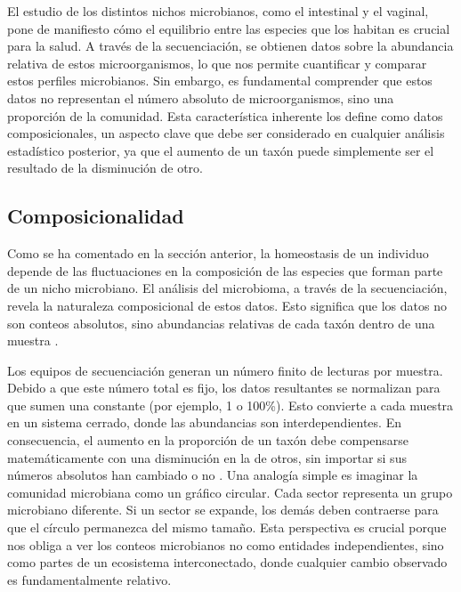 
El estudio de los distintos nichos microbianos, como el intestinal y el vaginal, pone de manifiesto cómo el equilibrio entre las especies que los habitan es crucial para la salud. A través de la secuenciación, se obtienen datos sobre la abundancia relativa de estos microorganismos, lo que nos permite cuantificar y comparar estos perfiles microbianos. Sin embargo, es fundamental comprender que estos datos no representan el número absoluto de microorganismos, sino una proporción de la comunidad. Esta característica inherente los define como datos composicionales, un aspecto clave que debe ser considerado en cualquier análisis estadístico posterior, ya que el aumento de un taxón puede simplemente ser el resultado de la disminución de otro.


\subsection{Composicionalidad}

Como se ha comentado en la sección anterior, la homeostasis de un individuo depende de las fluctuaciones en la composición de las especies que forman parte de un nicho microbiano. El análisis del microbioma, a través de la secuenciación, revela la naturaleza composicional de estos datos. Esto significa que los datos no son conteos absolutos, sino abundancias relativas de cada taxón dentro de una muestra \cite{busato2023compositionality}.

Los equipos de secuenciación generan un número finito de lecturas por muestra. Debido a que este número total es fijo, los datos resultantes se normalizan para que sumen una constante (por ejemplo, 1 o 100\%). Esto convierte a cada muestra en un sistema cerrado, donde las abundancias son interdependientes. En consecuencia, el aumento en la proporción de un taxón debe compensarse matemáticamente con una disminución en la de otros, sin importar si sus números absolutos han cambiado o no \cite{gloor2017microbiome}. Una analogía simple es imaginar la comunidad microbiana como un gráfico circular. Cada sector representa un grupo microbiano diferente. Si un sector se expande, los demás deben contraerse para que el círculo permanezca del mismo tamaño. Esta perspectiva es crucial porque nos obliga a ver los conteos microbianos no como entidades independientes, sino como partes de un ecosistema interconectado, donde cualquier cambio observado es fundamentalmente relativo.

